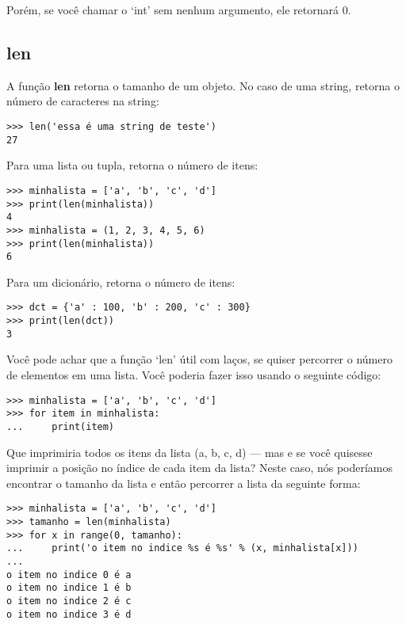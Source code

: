 \noindent
Porém, se você chamar o `int' sem nenhum argumento, ele retornará 0.

\subsection*{len}

A função \textbf{len} retorna o tamanho de um objeto. No caso de uma string, retorna o número de caracteres na string:

\begin{listing}
\begin{verbatim}
>>> len('essa é uma string de teste')
27
\end{verbatim}
\end{listing}

\noindent
Para uma lista ou tupla, retorna o número de itens:

\begin{listing}
\begin{verbatim}
>>> minhalista = ['a', 'b', 'c', 'd']
>>> print(len(minhalista))
4
>>> minhalista = (1, 2, 3, 4, 5, 6)
>>> print(len(minhalista))
6
\end{verbatim}
\end{listing}

\noindent
Para um dicionário, retorna o número de itens:

\begin{listing}
\begin{verbatim}
>>> dct = {'a' : 100, 'b' : 200, 'c' : 300}
>>> print(len(dct))
3
\end{verbatim}
\end{listing}

\noindent
Você pode achar que a função `len' útil com laços, se quiser percorrer o número de elementos em uma lista. Você poderia fazer isso usando o seguinte código:

\begin{listing}
\begin{verbatim}
>>> minhalista = ['a', 'b', 'c', 'd']
>>> for item in minhalista:
...     print(item)
\end{verbatim}
\end{listing}

\noindent
Que imprimiria todos os itens da lista (a, b, c, d) --- mas e se você quisesse imprimir a posição no índice de cada item da lista? Neste caso, nós poderíamos encontrar o tamanho da lista e então percorrer a lista da seguinte forma:

\begin{listing}
\begin{verbatim}
>>> minhalista = ['a', 'b', 'c', 'd']
>>> tamanho = len(minhalista)
>>> for x in range(0, tamanho):
...     print('o item no indice %s é %s' % (x, minhalista[x]))
... 
o item no indice 0 é a
o item no indice 1 é b
o item no indice 2 é c
o item no indice 3 é d
\end{verbatim}
\end{listing}

